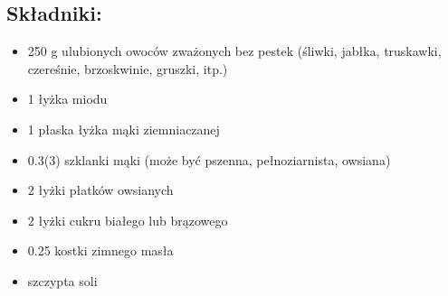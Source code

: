 \documentclass[a4paper,10pt]{book}
\begin{document}
\begin{multicols}{2}

\section*{Składniki:}
\begin{itemize}
    \item 250 g ulubionych owoców zważonych bez pestek (śliwki, jabłka, truskawki, czereśnie, brzoskwinie, gruszki, itp.)
    \item 1 łyżka miodu
    \item 1 płaska łyżka mąki ziemniaczanej
    \item 0.3(3) szklanki mąki (może być pszenna, pełnoziarnista, owsiana)
    \item 2 łyżki płatków owsianych 
    \item 2 łyżki cukru białego lub brązowego
    \item 0.25 kostki zimnego masła
    \item szczypta soli    
\end{itemize}

\columnbreak

\begin{figure}[H]
    \centering
\end{figure}
\end{multicols}

\vspace{0.5cm} 
\end{document}
